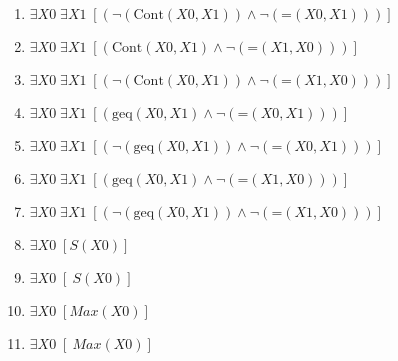 \documentclass{article}
\begin{document}
\begin{enumerate}
\item $\exists X0\; \exists X1\;  \left[ \left(\neg \left(\textrm{Cont}(X0,X1)\right) \land \neg \left(\textrm{=}(X0,X1)\right)\right) \right]$
\item $\exists X0\; \exists X1\;  \left[ \left(\textrm{Cont}(X0,X1) \land \neg \left(\textrm{=}(X1,X0)\right)\right) \right]$
\item $\exists X0\; \exists X1\;  \left[ \left(\neg \left(\textrm{Cont}(X0,X1)\right) \land \neg \left(\textrm{=}(X1,X0)\right)\right) \right]$
\item $\exists X0\; \exists X1\;  \left[ \left(\textrm{geq}(X0,X1) \land \neg \left(\textrm{=}(X0,X1)\right)\right) \right]$
\item $\exists X0\; \exists X1\;  \left[ \left(\neg \left(\textrm{geq}(X0,X1)\right) \land \neg \left(\textrm{=}(X0,X1)\right)\right) \right]$
\item $\exists X0\; \exists X1\;  \left[ \left(\textrm{geq}(X0,X1) \land \neg \left(\textrm{=}(X1,X0)\right)\right) \right]$
\item $\exists X0\; \exists X1\;  \left[ \left(\neg \left(\textrm{geq}(X0,X1)\right) \land \neg \left(\textrm{=}(X1,X0)\right)\right) \right]$
\item $\exists X0\;  \left[ S(X0) \right]$
\item $\exists X0\;  \left[ ~S(X0) \right]$
\item $\exists X0\;  \left[ Max(X0) \right]$
\item $\exists X0\;  \left[ ~Max(X0) \right]$
\end{enumerate}
\end{document}
